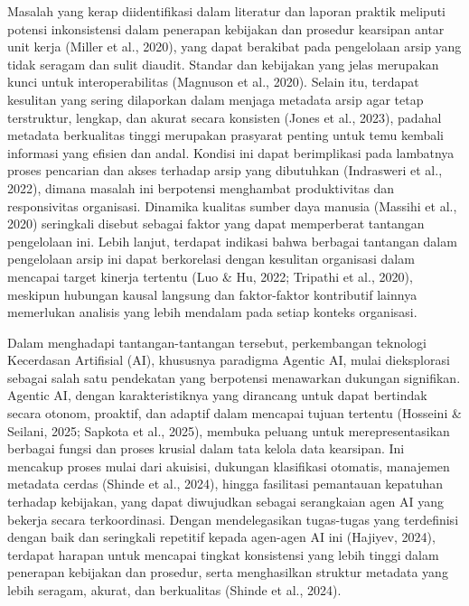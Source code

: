 Masalah yang kerap diidentifikasi dalam literatur dan laporan praktik
meliputi potensi inkonsistensi dalam penerapan kebijakan dan prosedur
kearsipan antar unit kerja (Miller et al., 2020), yang dapat berakibat
pada pengelolaan arsip yang tidak seragam dan sulit diaudit. Standar dan
kebijakan yang jelas merupakan kunci untuk interoperabilitas (Magnuson
et al., 2020). Selain itu, terdapat kesulitan yang sering dilaporkan
dalam menjaga metadata arsip agar tetap terstruktur, lengkap, dan akurat
secara konsisten (Jones et al., 2023), padahal metadata berkualitas
tinggi merupakan prasyarat penting untuk temu kembali informasi yang
efisien dan andal. Kondisi ini dapat berimplikasi pada lambatnya proses
pencarian dan akses terhadap arsip yang dibutuhkan (Indrasweri et al.,
2022), dimana masalah ini berpotensi menghambat produktivitas dan
responsivitas organisasi. Dinamika kualitas sumber daya manusia (Massihi
et al., 2020) seringkali disebut sebagai faktor yang dapat memperberat
tantangan pengelolaan ini. Lebih lanjut, terdapat indikasi bahwa
berbagai tantangan dalam pengelolaan arsip ini dapat berkorelasi dengan
kesulitan organisasi dalam mencapai target kinerja tertentu (Luo \& Hu,
2022; Tripathi et al., 2020), meskipun hubungan kausal langsung dan
faktor-faktor kontributif lainnya memerlukan analisis yang lebih
mendalam pada setiap konteks organisasi.

Dalam menghadapi tantangan-tantangan tersebut, perkembangan teknologi
Kecerdasan Artifisial (AI), khususnya paradigma Agentic AI, mulai
dieksplorasi sebagai salah satu pendekatan yang berpotensi menawarkan
dukungan signifikan. Agentic AI, dengan karakteristiknya yang dirancang
untuk dapat bertindak secara otonom, proaktif, dan adaptif dalam
mencapai tujuan tertentu (Hosseini \& Seilani, 2025; Sapkota et al.,
2025), membuka peluang untuk merepresentasikan berbagai fungsi dan
proses krusial dalam tata kelola data kearsipan. Ini mencakup proses
mulai dari akuisisi, dukungan klasifikasi otomatis, manajemen metadata
cerdas (Shinde et al., 2024), hingga fasilitasi pemantauan kepatuhan
terhadap kebijakan, yang dapat diwujudkan sebagai serangkaian agen AI
yang bekerja secara terkoordinasi. Dengan mendelegasikan tugas-tugas
yang terdefinisi dengan baik dan seringkali repetitif kepada agen-agen
AI ini (Hajiyev, 2024), terdapat harapan untuk mencapai tingkat
konsistensi yang lebih tinggi dalam penerapan kebijakan dan prosedur,
serta menghasilkan struktur metadata yang lebih seragam, akurat, dan
berkualitas (Shinde et al., 2024).

